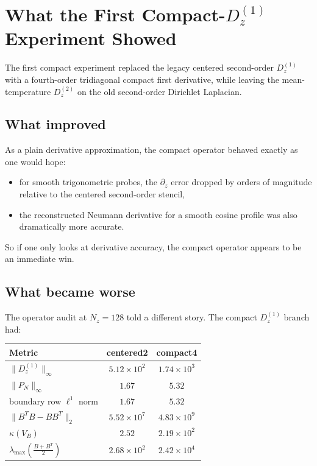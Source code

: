 \documentclass[11pt]{article}
\newcommand{\Dzone}{D^{(1)}_z}
\newcommand{\Dztwo}{D^{(2)}_z}
\newcommand{\Pmat}{P_N}
\begin{document}
\section{What the First Compact-$D^{(1)}_z$ Experiment Showed}

The first compact experiment replaced the legacy centered second-order
$\Dzone$ with a fourth-order tridiagonal compact first derivative, while
leaving the mean-temperature $\Dztwo$ on the old second-order Dirichlet
Laplacian.

\subsection{What improved}

As a plain derivative approximation, the compact operator behaved exactly as one
would hope:
\begin{itemize}[nosep]
\item for smooth trigonometric probes, the $\partial_z$ error dropped by orders
  of magnitude relative to the centered second-order stencil,
\item the reconstructed Neumann derivative for a smooth cosine profile was also
  dramatically more accurate.
\end{itemize}

So if one only looks at derivative accuracy, the compact operator appears to be
an immediate win.

\subsection{What became worse}

The operator audit at $N_z=128$ told a different story. The compact
$\Dzone$ branch had:
\begin{center}
\begin{tabular}{lcc}
\toprule
Metric & centered2 & compact4 \\
\midrule
$\|\Dzone\|_{\infty}$ & $5.12\times 10^2$ & $1.74\times 10^3$ \\
$\|\Pmat\|_{\infty}$ & $1.67$ & $5.32$ \\
boundary row $\ell^1$ norm & $1.67$ & $5.32$ \\
$\|B^T B - B B^T\|_2$ & $5.52\times 10^7$ & $4.83\times 10^9$ \\
$\kappa(V_B)$ & $2.52$ & $2.19\times 10^2$ \\
$\lambda_{\max}\!\left(\tfrac{B+B^T}{2}\right)$ & $2.68\times 10^2$ & $2.42\times 10^4$ \\
\bottomrule
\end{tabular}
\end{center}
\end{document}
